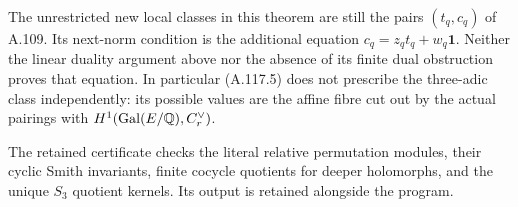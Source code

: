 The unrestricted new local classes in this theorem
are still the pairs \((t_q,c_q)\) of A.109.
Its next-norm condition is the additional equation
\(c_q=z_qt_q+w_q\mathbf1\).
Neither the linear duality argument above nor the
absence of its finite dual obstruction proves that
equation.  In particular (A.117.5) does not prescribe
the three-adic class independently: its possible
values are the affine fibre cut out by the actual
pairings with
\(H^1(\operatorname{Gal}(E/\mathbb Q),C_r^\vee)\).

The retained certificate
checks the literal relative permutation modules,
their cyclic Smith invariants, finite cocycle
quotients for deeper holomorphs, and the unique
\(S_3\) quotient kernels.  Its output is retained
alongside the program.
